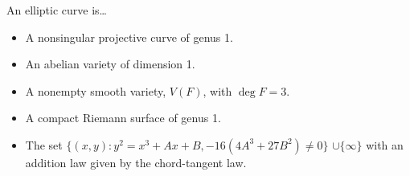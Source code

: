 \begin{frame}[plain]
\footnotesize
\begin{dfn}
An elliptic curve is\dots
\begin{itemize}
\item A nonsingular projective curve of genus 1. \pspace
\item An abelian variety of dimension 1. \pspace
\item A nonempty smooth variety, $V(F)$, with $\deg F=3$. \pspace
\item A compact Riemann surface of genus 1. \pspace
\item The set $\{(x,y) \colon y^2= x^3 + Ax + B, -16(4A^3+27B^2) \neq 0 \}$ $\cup \{\infty\}$ with an addition law given by the chord-tangent law. 
\end{itemize}
\end{dfn}
\end{frame}





\begin{frame}[plain]
\end{frame}






